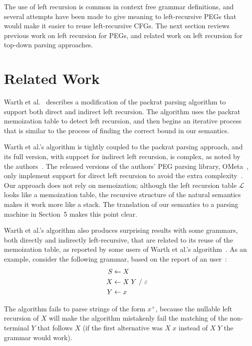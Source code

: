The use of left recursion is common in context free grammar definitions, and
several attempts have been made to give meaning to left-recursive PEGs
that would make it easier to reuse left-recursive CFGs. The next
section reviews previous work on left recursion for PEGs, and
related work on left recursion for top-down parsing approaches.

\section{Related Work}
\label{sec:related}

Warth et al.~\cite{warth:left} describes a modification of the packrat
parsing algorithm to support both direct and indirect left
recursion. The algorithm uses the packrat memoization table to detect
left recursion, and then begins an iterative process that is similar
to the process of finding the correct bound in our semantics.

Warth et al.'s algorithm is tightly coupled to the packrat parsing
approach, and its full version, with support for indirect left
recursion, is complex, as noted by the
authors~\cite{ometa:complexity1}. The released versions of the authors'
PEG parsing library, OMeta~\cite{warth:ometa}, only implement support
for direct left recursion to avoid the extra complexity~\cite{ometa:complexity1}.
Our approach does not rely on memoization; although the left recursion table $\mathcal{L}$
looks like a memoization table, the recursive structure of the natural semantics
makes it work more like a stack. The translation of our semantics to a parsing
machine in Section~5 makes this point clear.

Warth et al.'s algorithm also produces surprising results with some grammars,
both directly and indirectly left-recursive, that are related to its reuse of the
memoization table, as reported by some users
of Warth et al.'s algorithm~\cite{peglist:problemleft1, peglist:problemleft2, ometalist:problemleft1}.
As an example, consider the following grammar, based on the report of an user~\cite{peglist:problemleft1}:
\begin{align*}
S & \leftarrow X  \\
X & \leftarrow X \; Y \ / \ \Epsi \\
Y & \leftarrow x
\end{align*}

The algorithm fails to parse strings of the form $x^+$, because the
nullable left recursion of $X$ will make the algorithm mistakenly fail the
matching of  the non-terminal $Y$ that follows $X$ (if the first alternative
was $X \; x$ instead of $X \; Y$ the grammar would work).


